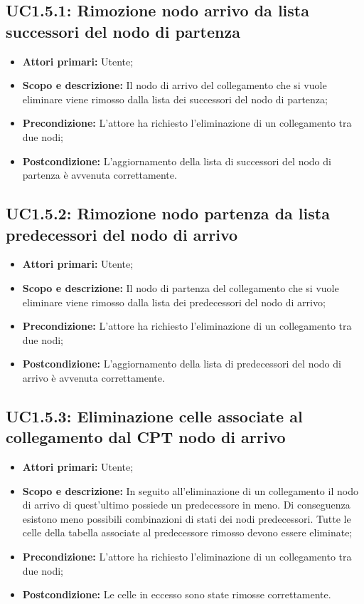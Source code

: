 \subsection{UC1.5.1: Rimozione nodo arrivo da lista successori del nodo di partenza} 
\begin{itemize} 
	\item{\textbf{Attori primari:} Utente;} 
	\item{\textbf{Scopo e descrizione:} Il nodo di arrivo del collegamento che si vuole eliminare viene rimosso dalla lista dei successori del nodo di partenza;} 
	\item{\textbf{Precondizione:} L'attore ha richiesto l'eliminazione di un collegamento tra due nodi;} 
	\item{\textbf{Postcondizione:} L'aggiornamento della lista di successori del nodo di partenza è avvenuta correttamente.} 
\end{itemize} 
\subsection{UC1.5.2: Rimozione nodo partenza da lista predecessori del nodo di arrivo} 
\begin{itemize} 
	\item{\textbf{Attori primari:} Utente;} 
	\item{\textbf{Scopo e descrizione:} Il nodo di partenza del collegamento che si vuole eliminare viene rimosso dalla lista dei predecessori del nodo di arrivo;} 
	\item{\textbf{Precondizione:} L'attore ha richiesto l'eliminazione di un collegamento tra due nodi;} 
	\item{\textbf{Postcondizione:} L'aggiornamento della lista di predecessori del nodo di arrivo è avvenuta correttamente.} 
\end{itemize} 
\subsection{UC1.5.3: Eliminazione celle associate al collegamento dal CPT nodo di arrivo} 
\begin{itemize} 
	\item{\textbf{Attori primari:} Utente;} 
	\item{\textbf{Scopo e descrizione:} In seguito all'eliminazione di un collegamento il nodo di arrivo di quest'ultimo possiede un predecessore in meno. Di conseguenza esistono meno possibili combinazioni di stati dei nodi predecessori. Tutte le celle della tabella associate al predecessore rimosso devono essere eliminate;} 
	\item{\textbf{Precondizione:} L'attore ha richiesto l'eliminazione di un collegamento tra due nodi;} 
	\item{\textbf{Postcondizione:} Le celle in eccesso sono state rimosse correttamente.} 
\end{itemize} 
